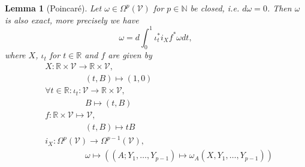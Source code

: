 \documentclass[b5paper,draft,openbib,12pt]{memoir}
\newtheorem{Lemma}[Def]{Lemma}
\begin{document}
\begin{Lemma}[Poincaré]
  Let \(\omega\in \Omega^p(\mathcal{V})\) for 
  \(p\in\mathbb{N}\) be closed, i.e. \(d \omega =0\). 
  Then \(\omega\) is also exact, more precisely we have
  \begin{equation}
  \omega=d \int_{0}^1 \iota^*_t i_X f^* \omega dt,
  \end{equation}
  where \(X\), \(\iota_t\) for \(t\in\mathbb{R}\) and \(f\) are given by
   \begin{align}
   &X: \mathbb{R}\times\mathcal{V}\rightarrow \mathbb{R}\times\mathcal{V},\\
   &\hspace{2cm} (t,B)\mapsto (1,0) \\
  &\forall t \in \mathbb{R}: \iota_t: \mathcal{V}\rightarrow \mathbb{R}\times\mathcal{V},\\
  &\hspace{2cm} B\mapsto (t,B)\\
  &f:\mathbb{R}\times \mathcal{V}\mapsto \mathcal{V},\\
  &\hspace{2cm} (t,B) \mapsto t B\\
  &i_X: \Omega^p(\mathcal{V})\rightarrow \Omega^{p-1}(\mathcal{V}),\\
  &\hspace{2cm} \omega \mapsto ((A;Y_1,\dots, Y_{p-1})\mapsto \omega_A(X,Y_1,\dots,Y_{p-1}))
   \end{align}
  \end{Lemma}
\end{document}
